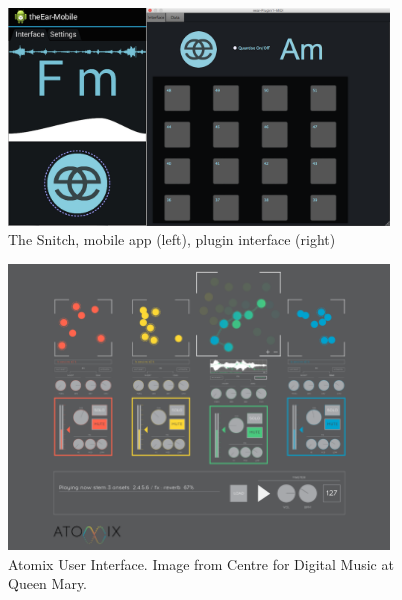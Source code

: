 \begin{figure}
	\begin{center}
		\includegraphics[width=0.9\textwidth]{ch99/figures/combined.png}
	\end{center}
	\caption[The Snitch Enhanced DJ Assistant Mobile and Plugin Interface]{The Snitch, mobile app (left), plugin interface (right)}
	\label{fig:eear}
\end{figure}

\begin{figure}
	\begin{center}
		\includegraphics[width=0.9\textwidth]{ch99/figures/atomix.png}
	\end{center}
	\caption[Atomix User Interface]{Atomix User Interface. Image from Centre for Digital Music at Queen Mary.}
	\label{fig:atomix}
\end{figure}



